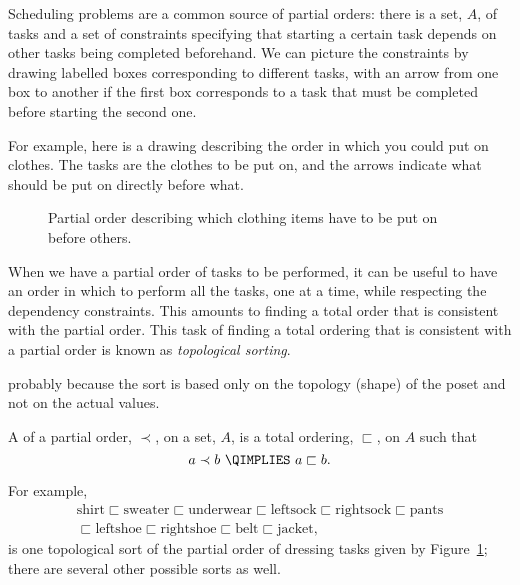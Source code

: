 Scheduling problems are a common source of partial orders: there is a set,
$A$, of tasks and a set of constraints specifying that starting a certain
task depends on other tasks being completed beforehand.  We can picture
the constraints by drawing labelled boxes corresponding to different
tasks, with an arrow from one box to another if the first box corresponds
to a task that must be completed before starting the second one.

For example, here is a drawing describing the order in which you could put
on clothes.  The tasks are the clothes to be put on, and the arrows
indicate what should be put on directly before what.

\begin{figure}


\caption{Partial order describing which clothing items have to be put on before others.}

\label{fig:7FP}

\end{figure}

When we have a partial order of tasks to be performed, it can be useful to
have an order in which to perform all the tasks, one at a time, while
respecting the dependency constraints.  This amounts to finding a total
order that is consistent with the partial order.  This task of finding a
total ordering that is consistent with a partial order is known as
\emph{topological sorting}. 

\begin{staffnotes}
probably because the sort is based only on the topology (shape) of the
poset and not on the actual values.
\end{staffnotes}

\begin{definition}
A  of a partial order, $\prec$, on a set, $A$, is
a total ordering, $\sqsubset$, on $A$ such that
\[
a \prec b\ \QIMPLIES\  a \sqsubset b.
\]
\end{definition}

For example,
\begin{align*}
  \text{shirt} \sqsubset \text{sweater} \sqsubset \text{underwear}
  \sqsubset \text{leftsock}
  \sqsubset \text{rightsock} \sqsubset \text{pants}\\
  \sqsubset \text{leftshoe} \sqsubset \text{rightshoe} \sqsubset
  \text{belt} \sqsubset \text{jacket},
\end{align*}
is one topological sort of the partial order of dressing tasks given by
Figure~\ref{fig:7FP}; there are several other possible sorts as well.

